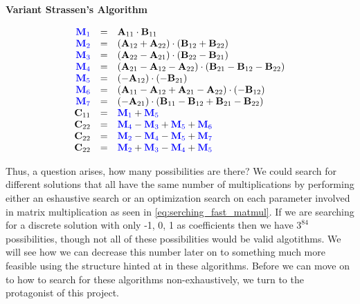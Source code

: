     \begin{center}
        \textbf{Variant Strassen's Algorithm}
        \vspace{-20pt}
    \end{center}
    \begin{equation}
        \begin{array}{rcl}
            \color{blue} \mathbf{M}_1 & = & \mathbf{A}_{11}\cdot \mathbf{B}_{11} \\
            \color{blue} \mathbf{M}_2 & = & (\mathbf{A}_{12} + \mathbf{A}_{22})\cdot (\mathbf{B}_{12} + \mathbf{B}_{22}) \\
            \color{blue} \mathbf{M}_3 & = & (\mathbf{A}_{22} - \mathbf{A}_{21})\cdot (\mathbf{B}_{22} - \mathbf{B}_{21}) \\
            \color{blue} \mathbf{M}_4 & = & (\mathbf{A}_{21} - \mathbf{A}_{12} - \mathbf{A}_{22})\cdot (\mathbf{B}_{21} - \mathbf{B}_{12} - \mathbf{B}_{22}) \\
            \color{blue} \mathbf{M}_5 & = & (-\mathbf{A}_{12})\cdot (-\mathbf{B}_{21}) \\
            \color{blue} \mathbf{M}_6 & = & (\mathbf{A}_{11} - \mathbf{A}_{12} + \mathbf{A}_{21} - \mathbf{A}_{22})\cdot (- \mathbf{B}_{12}) \\
            \color{blue} \mathbf{M}_7 & = & (- \mathbf{A}_{21})\cdot (\mathbf{B}_{11} - \mathbf{B}_{12} + \mathbf{B}_{21} - \mathbf{B}_{22}) \\
            \mathbf{C}_{11} & = & \color{blue} \mathbf{M}_1 \color{black} + \color{blue} \mathbf{M}_5 \\
            \mathbf{C}_{22} & = & \color{blue} \mathbf{M}_4 \color{black} - \color{blue} \mathbf{M}_3 \color{black} + \color{blue} \mathbf{M}_5 \color{black} + \color{blue} \mathbf{M}_6 \\
            \mathbf{C}_{22} & = & \color{blue} \mathbf{M}_2 \color{black} - \color{blue} \mathbf{M}_4 \color{black} - \color{blue} \mathbf{M}_5 \color{black} + \color{blue} \mathbf{M}_7 \\
            \mathbf{C}_{22} & = & \color{blue} \mathbf{M}_2 \color{black} + \color{blue} \mathbf{M}_3 \color{black} - \color{blue} \mathbf{M}_4 \color{black} + \color{blue} \mathbf{M}_5
        \end{array}
        \label{eq:var_strassen}
    \end{equation}
    

    Thus, a question arises, how many possibilities are there? We could search
    for different solutions that all have the same number of multiplications by
    performing either an eshaustive search or an optimization search on each
    parameter involved in matrix multiplication as seen in
    \ref{eq:serching_fast_matmul}. If we are searching for a discrete solution
    with only -1, 0, 1 as coefficients then we have $3^{84}$ possibilities,
    though not all of these possibilities would be valid algotithms. We will see
    how we can decrease this number later on to something much more feasible
    using the structure hinted at in these algorithms. Before we can move on to
    how to search for these algorithms non-exhaustively, we turn to the
    protagonist of this project.



